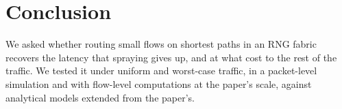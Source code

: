 \section{Conclusion}
\label{sec:conclusion}

We asked whether routing small flows on shortest paths in an RNG fabric recovers the latency that spraying gives up, and at what cost to the rest of the traffic. We tested it under uniform and worst-case traffic, in a packet-level simulation and with flow-level computations at the paper's scale, against analytical models extended from the paper's.
